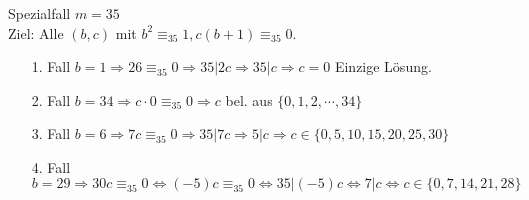 \documentclass[main.tex]{subfiles}
\begin{document}
\subsubsection{}
Spezialfall $m=35$\\
Ziel: Alle $(b,c)$ mit $b^2 \equiv_{35} 1, c(b+1) \equiv_{35} 0$.\\
\begin{itemize}
	\item [1. Fall ] $b=1 \Rightarrow 26 \equiv_{35} 0 \Rightarrow35|2c \Rightarrow 35|c \Rightarrow c=0$ Einzige Lösung.
	\item[2. Fall ] $b=34 \Rightarrow c \cdot 0 \equiv_{35} 0 \Rightarrow c$ bel. aus $\{0,1,2,\cdots,34\}$
	\item[3. Fall ] $b = 6 \Rightarrow 7c \equiv_{35} 0 \Rightarrow 35|7c \Rightarrow 5|c \Rightarrow c\in \{0,5,10,15,20,25,30\}$
	\item[4. Fall ] $b =29 \Rightarrow 30c \equiv_{35} 0 \Leftrightarrow (-5)c \equiv_{35} 0 \Leftrightarrow 35| (-5)c \Leftrightarrow 7|c \Leftrightarrow c \in \{0,7,14,21,28\}$
\end{itemize}
\end{document}
